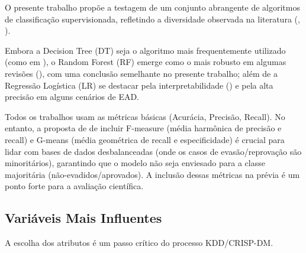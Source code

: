 \documentclass[english, spanish, brazilian]{RBIEarticle} %
\begin{document}
\newpage
O presente trabalho propõe a testagem de um conjunto abrangente de algoritmos de classificação supervisionada, refletindo a diversidade observada na literatura (\cite{jesus2024mapeamento}, \cite{tamada2025predicting}).

Embora a Decision Tree (DT) seja o algoritmo mais frequentemente utilizado (como em \cite{jesus2024mapeamento}), o Random Forest (RF) emerge como o mais robusto em algumas revisões (\cite{andradegiron2023predicting}), com uma conclusão semelhante no presente trabalho; além de a Regressão Logística (LR) se destacar pela interpretabilidade (\cite{ramos2018comparativo}) e pela alta precisão em alguns cenários de EAD.

Todos os trabalhos usam as métricas básicas (Acurácia, Precisão, Recall). No entanto, a proposta de \cite{neves2024ficare} de incluir F-measure (média harmônica de precisão e recall) e G-means (média geométrica de recall e especificidade) é crucial para lidar com bases de dados desbalanceadas (onde os casos de evasão/reprovação são minoritários), garantindo que o modelo não seja enviesado para a classe majoritária (não-evadidos/aprovados). A inclusão dessas métricas na prévia é um ponto forte para a avaliação científica.

\subsection{Variáveis Mais Influentes}

A escolha dos atributos é um passo crítico do processo KDD/CRISP-DM.
\end{document}
